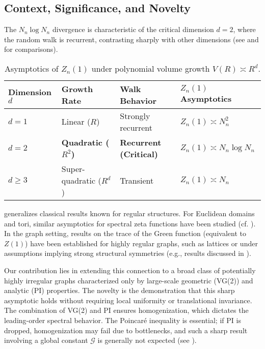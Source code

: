\documentclass[12pt]{amsart}
\theoremstyle{definition}
\theoremstyle{remark}
\newcommand{\cG}{\mathcal{G}}    %
\begin{document}
\subsection{Context, Significance, and Novelty}
The $N_n \log N_n$ divergence is characteristic of the critical dimension $d=2$, where the random walk is recurrent, contrasting sharply with other dimensions (see  and  for comparisons).

\begin{table}[h!]
\centering
\caption{Asymptotics of $Z_n(1)$ under polynomial volume growth $V(R) \asymp R^d$.}
\label{tab:growth}
\begin{tabular}{@{}llll@{}}
\toprule
\textbf{Dimension} $d$ & \textbf{Growth Rate} & \textbf{Walk Behavior} & $Z_n(1)$ \textbf{Asymptotics} \\
\midrule
$d=1$ & Linear ($R$) & Strongly recurrent & $Z_n(1) \asymp N_n^2$ \\
\textbf{$d=2$} & \textbf{Quadratic ($R^2$)} & \textbf{Recurrent (Critical)} & $Z_n(1) \asymp N_n \log N_n$ \\
$d\geq 3$ & Super-quadratic ($R^d$) & Transient & $Z_n(1) \asymp N_n$ \\
\bottomrule
\end{tabular}
\end{table}

 generalizes classical results known for regular structures. For Euclidean domains and tori, similar asymptotics for spectral zeta functions have been studied (cf. \cite{Colin85, Frank10}). In the graph setting, results on the trace of the Green function (equivalent to $Z(1)$) have been established for highly regular graphs, such as lattices or under assumptions implying strong structural symmetries (e.g., results discussed in \cite{MizunoTachikawa03, Kaimanovich00}).

Our contribution lies in extending this connection to a broad class of potentially highly irregular graphs characterized only by large-scale geometric (VG(2)) and analytic (PI) properties. The novelty is the demonstration that this sharp asymptotic holds without requiring local uniformity or translational invariance. The combination of VG(2) and PI ensures homogenization, which dictates the leading-order spectral behavior. The Poincaré inequality is essential; if PI is dropped, homogenization may fail due to bottlenecks, and such a sharp result involving a global constant $\cG$ is generally not expected (see ).
\end{document}

